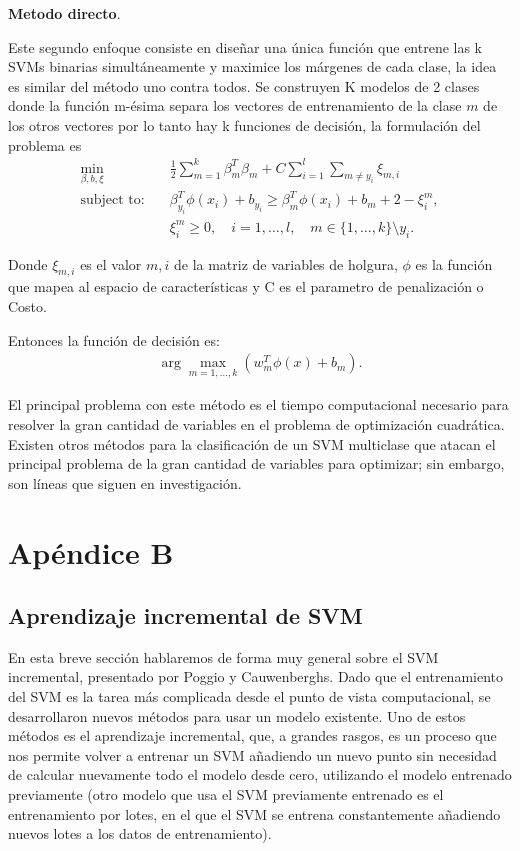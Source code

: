 \documentclass[letterpaper,12pt,oneside]{book}
\begin{document}
{{{{\textbf{Metodo directo}.

Este segundo enfoque consiste en diseñar una única función que entrene  las k SVMs binarias simultáneamente y maximice los márgenes de  cada clase, la idea es similar del método uno contra todos. Se construyen K modelos de 2 clases donde la función m-ésima separa los vectores de entrenamiento de la clase $m$ de los otros vectores por lo tanto hay k funciones de decisión, la formulación del problema es 
        \begin{align*}
        \min_{\beta, b, \xi} \quad & \frac{1}{2} \sum_{m=1}^{k} \beta_m^T \beta_m + C \sum_{i=1}^{l} \sum_{m \neq y_i} \xi_{m,i} \\
        \text{subject to:} \quad & \beta_{y_i}^T \phi(x_i) + b_{y_i} \geq \beta_m^T \phi(x_i) + b_m + 2 - \xi_i^m, \\
        & \xi_i^m \geq 0, \quad i = 1, \dots, l, \quad m \in \{1, \dots, k\} \setminus y_i.
        \end{align*}


        Donde $\xi_{m,i}$ es el valor $m,i$ de la matriz de variables de holgura, $\phi$ es la función que mapea al espacio de características y C es el parametro de penalización o Costo. 
        
        Entonces la función de decisión es:
        \begin{align*}
        \arg\max_{m=1, \dots, k} \left(w_m^T \phi(x) + b_m\right).
        \end{align*}
        
El principal problema con este método es el tiempo computacional necesario para resolver la gran cantidad de variables en el problema de optimización cuadrática. Existen otros métodos para la clasificación de un SVM multiclase que atacan el principal problema de la gran cantidad de variables para optimizar; sin embargo, son líneas que siguen en investigación.






\chapter*{Apéndice B}
\section*{Aprendizaje incremental de SVM}
En esta breve sección hablaremos de forma muy general sobre el SVM incremental, presentado por Poggio y Cauwenberghs. Dado que el entrenamiento del SVM es la tarea más complicada desde el punto de vista computacional, se desarrollaron nuevos métodos para usar un modelo existente. Uno de estos métodos es el aprendizaje incremental, que, a grandes rasgos, es un proceso que nos permite volver a entrenar un SVM añadiendo un nuevo punto sin necesidad de calcular nuevamente todo el modelo desde cero, utilizando el modelo entrenado previamente (otro modelo que usa el SVM previamente entrenado es el entrenamiento por lotes, en el que el SVM se entrena constantemente añadiendo nuevos lotes a los datos de entrenamiento).

}}}}
\end{document}
